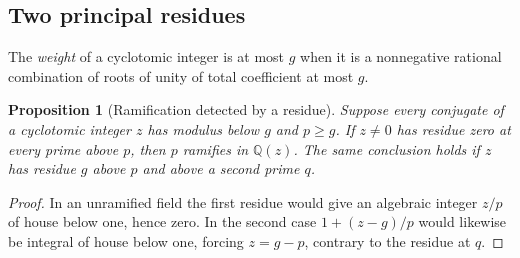 \documentclass[11pt,a4paper]{article}
\numberwithin{equation}{section}
\newtheorem{proposition}[theorem]{Proposition}
\theoremstyle{remark}
\newcommand{\QQ}{\mathbb Q}
\begin{document}
\subsection{Two principal residues}
The \emph{weight} of a cyclotomic integer is at most $g$ when it is a nonnegative rational combination of roots of unity of total coefficient at most $g$.

\begin{proposition}[Ramification detected by a residue]\label{deep:positive-inertia}
Suppose every conjugate of a cyclotomic integer $z$ has modulus below $g$ and $p\ge g$.
If $z\ne0$ has residue zero at every prime above $p$, then $p$ ramifies in $\QQ(z)$.
The same conclusion holds if $z$ has residue $g$ above $p$ and above a second prime $q$.
\end{proposition}\begin{proof}
In an unramified field the first residue would give an algebraic integer $z/p$ of house below one, hence zero. In the second case $1+(z-g)/p$ would likewise be integral of house below one, forcing $z=g-p$, contrary to the residue at $q$.
\end{proof}
\end{document}
